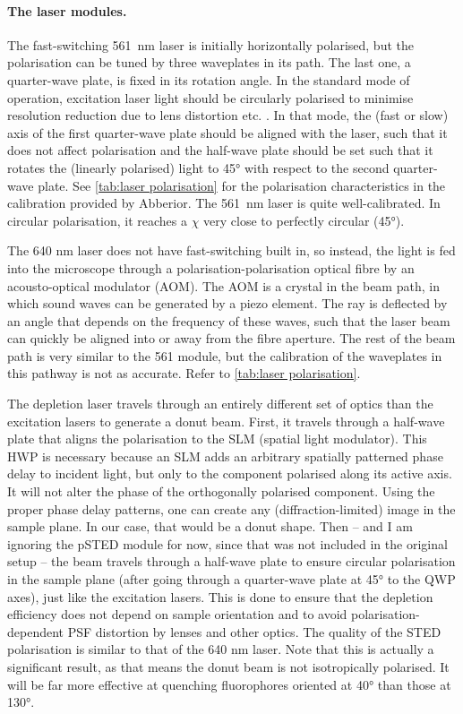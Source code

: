 \paragraph{The laser modules.} The fast-switching 561~nm laser is initially horizontally polarised, but the polarisation can be tuned by three waveplates in its path. The last one, a quarter-wave plate, is fixed in its rotation angle. In the standard mode of operation, excitation laser light should be circularly polarised to minimise resolution reduction due to lens distortion etc. \cite{Harke2008}. In that mode, the (fast or slow) axis of the first quarter-wave plate should be aligned with the laser, such that it does not affect polarisation and the half-wave plate should be set such that it rotates the (linearly polarised) light to \ang{45} with respect to the second quarter-wave plate. See \autoref{tab:laser polarisation} for the polarisation characteristics in the calibration provided by Abberior. The 561~nm laser is quite well-calibrated. In circular polarisation, it reaches a $ \chi $ very close to perfectly circular (\ang{45}).

The 640 nm laser does not have fast-switching built in, so instead, the light is fed into the microscope through a polarisation-polarisation optical fibre by an acousto-optical modulator (AOM). The AOM is a crystal in the beam path, in which sound waves can be generated by a piezo element. The ray is deflected by an angle that depends on the frequency of these waves, such that the laser beam can quickly be aligned into or away from the fibre aperture. The rest of the beam path is very similar to the 561 module, but the calibration of the waveplates in this pathway is not as accurate. Refer to \autoref{tab:laser polarisation}. 

The depletion laser travels through an entirely different set of optics than the excitation lasers to generate a donut beam. First, it travels through a half-wave plate that aligns the polarisation to the SLM (spatial light modulator). This HWP is necessary because an SLM adds an arbitrary spatially patterned phase delay to incident light, but only to the component polarised along its active axis. It will not alter the phase of the orthogonally polarised component. Using the proper phase delay patterns, one can create any (diffraction-limited) image in the sample plane. In our case, that would be a donut shape. Then -- and I am ignoring the pSTED module for now, since that was not included in the original setup -- the beam travels through a half-wave plate to ensure circular polarisation in the sample plane (after going through a quarter-wave plate at \ang{45} to the QWP axes), just like the excitation lasers. This is done to ensure that the depletion efficiency does not depend on sample orientation and to avoid polarisation-dependent PSF distortion by lenses and other optics. The quality of the STED polarisation is similar to that of the 640 nm laser. Note that this is actually a significant result, as that means the donut beam is not isotropically polarised. It will be far more effective at quenching fluorophores oriented at \ang{40} than those at \ang{130}.


